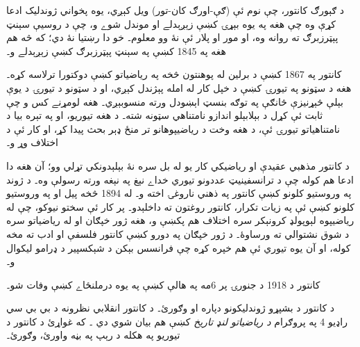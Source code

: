 \documentclass[../../../include/open-logic-section]{subfiles}
\begin{document}



د ګېورګ کانتور، چې نوم ئې (\textsc{ګې}-اورګ
\textsc{کان}-تور) ويل کېږي، يوه پخواني ژوندليک
ادعا کړې وه چې هغه په يوه بېړۍ کښې زېږېدلے او
موندل شوے و، چې د روسيې سېنټ پېټرزبرګ ته روانه
وه، او مور او پلار ئې نۀ وو معلوم۔ خو دا رښتيا
نۀ دي؛ که څه هم هغه په 1845 کښې په سېنټ پېټرزبرګ
کښې زېږېدلے و۔

کانتور په 1867 کښې د برلين له پوهنتون څخه په
رياضياتو کښې دوکتورا ترلاسه کړه۔ هغه د سټونو
په تيورۍ کښې د خپل کار له امله پېژندل کېږي،
او د سټونو د تيورۍ د يوې بېلې څېړنيزې څانګې
په توګه بنسټ اېښودل ورته منسوبېږي۔ هغه لومړنے
کس و چې ثابت ئې کړل د بېلابېلو اندازو
نامتناهي سټونه شته۔ د هغه تيوريو، او په تېره
بيا د نامتناهياتو تيورۍ ئې، د هغه وخت د
رياضيپوهانو تر منځ ډېر بحث پيدا کړ، او کار
ئې د اختلاف وړ و۔

د کانتور مذهبي عقيدې او رياضيکي کار يو له بل
سره نۀ بېلېدونکي تړلي وو؛ آن هغه دا ادعا هم
کوله چې د ترانسفينيټ عددونو تيوري خداے نېغ
په نېغه ورته رسولې وه۔ د ژوند په وروستيو
کلونو کښې کانتور په ذهني ناروغۍ اخته و۔
له 1894 څخه پيل او په وروستيو کلونو کښې
ئې په زيات تکرار، کانتور روغتون ته داخلېدو۔
پر کار ئې سختو نيوکو، چې له رياضيپوه
لېوپولډ کرونېکر سره اختلاف هم پکښې و،
هغه ژور خپګان او له رياضياتو سره د شوق
نشتوالي ته ورساوۀ۔ د ژور خپګان په دورو
کښې کانتور فلسفې او ادب ته مخه کوله، او
آن يوه تيوري ئې هم خپره کړه چې فرانسس
بېکن د شېکسپير د ډرامو ليکوال و۔

کانتور د 1918 د جنورۍ پر 6مه په هالې
کښې په يوه درملنځاے کښې وفات شو۔

\begin{reading}
د کانتور د بشپړو ژوندليکونو دپاره
\citet{Dauben1990} او \citet{Grattan-Guinness1971}
وګورئ۔ د کانتور انقلابي نظرونه د بي بي سي
راډيو 4 په پروګرام \emph{د رياضياتو لنډ تاريخ}
کښې هم بيان شوي دي \citep{Sautoy2014}۔ که
غواړئ د کانتور د تيوريو په هکله د رېپ
په بڼه واورئ، \citet{Rose2012} وګورئ۔
\end{reading}
\end{document}
